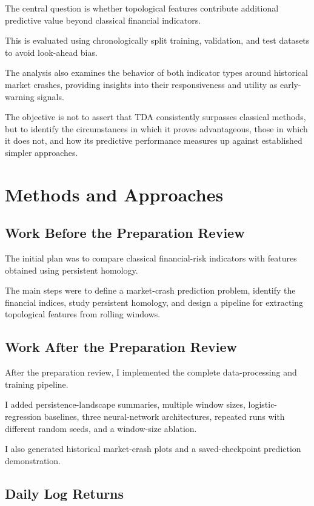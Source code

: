 \documentclass[oneside,english,11pt]{article}
\begin{document}
The central question is whether topological features contribute additional predictive value beyond classical financial indicators.

This is evaluated using chronologically split training, validation, and test datasets to avoid look-ahead bias.

The analysis also examines the behavior of both indicator types around historical market crashes, providing insights into their responsiveness and utility as early-warning signals.

The objective is not to assert that TDA consistently surpasses classical methods, but to identify the circumstances in which it proves advantageous, those in which it does not, and how its predictive performance measures up against established simpler approaches.

\section{Methods and Approaches}
\label{sec:methods}

\subsection{Work Before the Preparation Review}

The initial plan was to compare classical financial-risk
indicators with features obtained using persistent homology.

The main steps were to define a market-crash prediction
problem, identify the financial indices, study persistent
homology, and design a pipeline for extracting topological
features from rolling windows.

\subsection{Work After the Preparation Review}

After the preparation review, I implemented the complete
data-processing and training pipeline.

I added persistence-landscape summaries, multiple
window sizes, logistic-regression baselines, three
neural-network architectures, repeated runs with different
random seeds, and a window-size ablation.

I also generated historical market-crash plots and
a saved-checkpoint prediction demonstration.

\subsection{Daily Log Returns}
\end{document}
